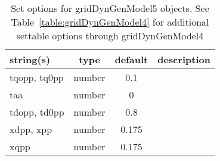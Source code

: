 \begin{table}[ht]
\centering
\begin{tabular}{p{5cm} c c p{7cm}}
\hline
string(s) & type & default & description \\
\hline
tqopp, tq0pp & number & 0.1 & \\
taa & number & 0 & \\
tdopp, td0pp & number & 0.8 & \\
xdpp, xpp & number & 0.175 & \\
xqpp & number & 0.175 & \\
\hline
\end{tabular}
\caption{Set options for gridDynGenModel5 objects. See Table~\ref{table:gridDynGenModel4} for additional settable options through gridDynGenModel4}
\label{table:gridDynGenModel5}
\end{table}

